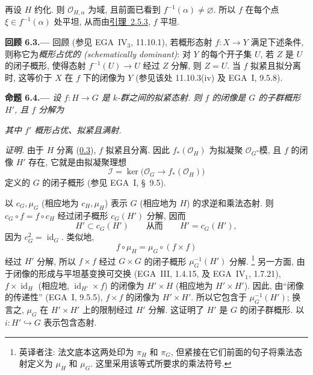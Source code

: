 再设 \(H\) 约化. 则 \(\mathcal O_{H,\alpha}\) 为域,
且前面已看到 \(f^{-1}(\alpha)\ne\varnothing\).
所以 \(f\) 在每个点 \(\xi\in f^{-1}(\alpha)\) 处平坦,
从而由\hyperref[lem:sga3-VIA-2.5.3]{引理~2.5.3}, \(f\) 平坦.

\medskip
{}\label{rem:sga3-VIA-6.3}%
\noindent\textbf{回顾 6.3.---}
回顾 (参见 EGA~IV\(_3\), 11.10.1),
若概形态射 \(f:X\to Y\) 满足下述条件, 则称它为\emph{概形占优的 (schematically dominant)}:
对 \(Y\) 的每个开子集 \(U\),
若 \(Z\) 是 \(U\) 的闭子概形,
使得态射 \(f^{-1}(U)\to U\) 经过 \(Z\) 分解, 则 \(Z=U\).
当 \(f\) 拟紧且拟分离时,
这等价于 \(X\) 在 \(f\) 下的闭像为 \(Y\)
(参见该处 11.10.3(iv) 及 EGA~I, 9.5.8).

\medskip
{}\label{prop:sga3-VIA-6.4}%
\noindent\textbf{命题 6.4.---}
\emph{设 \(f:H\to G\) 是 \(k\)-群之间的拟紧态射.
则 \(f\) 的闭像是 \(G\) 的子群概形 \(H'\), 且 \(f\) 分解为}
\begin{center}
  \label{diag:sga3-VIA-6.4-factorization}%
\end{center}
\emph{其中 \(f'\) 概形占优、拟紧且满射.}

\emph{证明.}
由于 \(H\) 分离 (\hyperref[sga3:VIA:0.3]{0.3}),
\(f\) 拟紧且分离. 因此 \(f_*(\mathcal O_H)\) 为拟凝聚
\(\mathcal O_G\)-模, 且 \(f\) 的闭像 \(H'\) 存在,
它就是由拟凝聚理想
\[
  \mathcal I
    =\ker\bigl(\mathcal O_G\longrightarrow f_*(\mathcal O_H)\bigr)
\]
定义的 \(G\) 的闭子概形 (参见 EGA~I, \S~9.5).

以 \(c_G,\mu_G\) (相应地为 \(c_H,\mu_H\)) 表示
\(G\) (相应地为 \(H\)) 的求逆和乘法态射.
则 \(c_G\circ f=f\circ c_H\) 经过闭子概形 \(c_G(H')\) 分解, 因而
\[
  H'\subset c_G(H')
  \qquad\text{从而}\qquad
  H'=c_G(H'),
\]
因为 \(c_G^2=\operatorname{id}_G\). 类似地,
\[
  f\circ\mu_H=\mu_G\circ(f\times f)
\]
经过 \(H'\) 分解,
所以 \(f\times f\) 经过 \(G\times G\) 的闭子概形
\(\mu_G^{-1}(H')\) 分解.%
\begingroup
\renewcommand{\thefootnote}{\fnsymbol{footnote}}%
\footnote[1]{\label{note:sga3-VIA-6.4-multiplication-symbol}%
英译者注: 法文底本这两处印为 \(\pi_H\) 和 \(\pi_G\),
但紧接在它们前面的句子将乘法态射定义为 \(\mu_H\) 和 \(\mu_G\).
这里采用该等式所要求的乘法符号.}%
\endgroup{}
另一方面, 由于闭像的形成与平坦基变换可交换
(EGA~III, 1.4.15, 及 EGA~IV\(_1\), 1.7.21),
\(f\times\operatorname{id}_H\)
(相应地, \(\operatorname{id}_{H'}\times f\)) 的闭像为
\(H'\times H\) (相应地为 \(H'\times H'\)).
因此, 由“闭像的传递性” (EGA~I, 9.5.5),
\(f\times f\) 的闭像为 \(H'\times H'\).
所以它包含于 \(\mu_G^{-1}(H')\);
换言之, \(\mu_G\) 在 \(H'\times H'\) 上的限制经过 \(H'\) 分解.
这证明了 \(H'\) 是 \(G\) 的闭子群概形.
以 \(i:H'\hookrightarrow G\) 表示包含态射.

